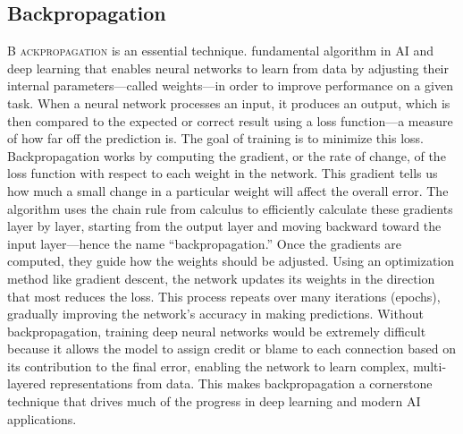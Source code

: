 \documentclass{book}
\begin{document}
\subsection{Backpropagation}
\lettrine{B}{ ackpropagation} is an essential technique. fundamental algorithm in AI and deep learning that enables neural networks to learn from data by adjusting their internal parameters—called weights—in order to improve performance on a given task. When a neural network processes an input, it produces an output, which is then compared to the expected or correct result using a loss function—a measure of how far off the prediction is. The goal of training is to minimize this loss.
Backpropagation works by computing the gradient, or the rate of change, of the loss function with respect to each weight in the network. This gradient tells us how much a small change in a particular weight will affect the overall error. The algorithm uses the chain rule from calculus to efficiently calculate these gradients layer by layer, starting from the output layer and moving backward toward the input layer—hence the name “backpropagation.”
Once the gradients are computed, they guide how the weights should be adjusted. Using an optimization method like gradient descent, the network updates its weights in the direction that most reduces the loss. This process repeats over many iterations (epochs), gradually improving the network’s accuracy in making predictions.
Without backpropagation, training deep neural networks would be extremely difficult because it allows the model to assign credit or blame to each connection based on its contribution to the final error, enabling the network to learn complex, multi-layered representations from data. This makes backpropagation a cornerstone technique that drives much of the progress in deep learning and modern AI applications.
\end{document}
